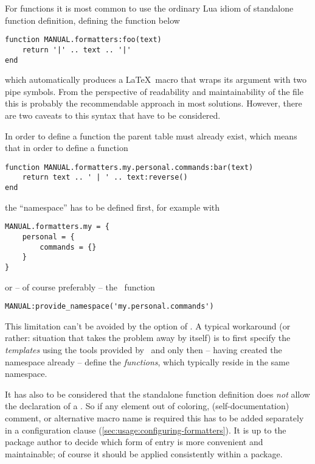 \documentclass[12pt]{scrartcl}
\begin{document}
For functions it is most common to use the ordinary Lua idiom of standalone function definition, defining the function below 

\begin{verbatim}
function MANUAL.formatters:foo(text)
    return '|' .. text .. '|'
end
\end{verbatim}

\noindent which automatically produces a \LaTeX\ macro
 that wraps its argument 
with two pipe symbols.  From the perspective of readability and maintainability
of the file this is probably the recommendable approach in most solutions.
However, there are two caveats to this syntax that have to be considered.

In order to define a function the parent table must already exist, which means
that in order to define a function

\begin{verbatim}
function MANUAL.formatters.my.personal.commands:bar(text)
    return text .. ' | ' .. text:reverse()
end
\end{verbatim}

\noindent the “namespace”  has to be defined first,
for example with

\begin{verbatim}
MANUAL.formatters.my = {
	personal = {
		commands = {}
	}
}
\end{verbatim}

\noindent or -- of course preferably -- the \luatemplates\ function

\begin{verbatim}
MANUAL:provide_namespace('my.personal.commands')
\end{verbatim}

\noindent This limitation can't be avoided by the  option
of \luatemplates.  A typical workaround (or rather: situation that
takes the problem away by itself) is to first specify the \emph{templates} using
the tools provided by \luatemplates\ and only then -- having created the
namespace already -- define the \emph{functions}, which typically reside in the
same namespace.

\medskip

It has also to be considered that the standalone function definition does \emph{not} allow the declaration of a .  So if any element out of coloring, (self-documentation) comment, or alternative macro name is required this has to be added separately in a configuration clause (\vref{sec:usage:configuring-formatters}).  It is up to the package author to decide which form of entry is more convenient and maintainable; of course it should be applied consistently within a package.
\end{document}
